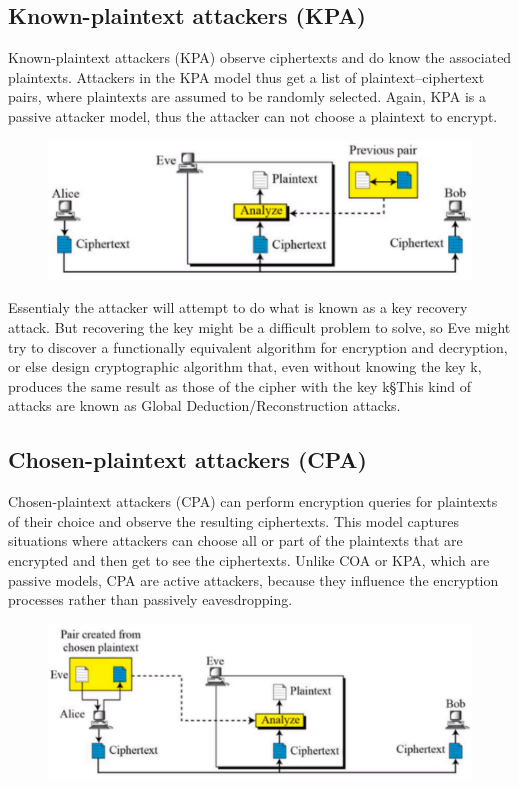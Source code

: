 	\subsection{Known-plaintext attackers (KPA)}
	Known-plaintext attackers (KPA) observe ciphertexts and do know the associated plaintexts. Attackers in the KPA model thus get a list of plaintext–ciphertext pairs, where plaintexts are assumed to be randomly selected. Again, KPA is a passive attacker model, thus the attacker can not choose a plaintext to encrypt.
	\begin{figure}
		\centering
		\includegraphics[width=0.7\linewidth]{Images/Chapter1/screenshot002}
		\caption{}
		\label{fig:chapter1_screenshot002}
	\end{figure}
	
	Essentialy the attacker will attempt to do what is known as a key recovery attack. But recovering the key might be a difficult problem to solve, so Eve might try to discover a functionally equivalent algorithm for encryption and decryption, or else design cryptographic algorithm that, even without knowing the key k, produces the same result as those of the cipher with the key k§This kind of attacks are known as Global Deduction/Reconstruction attacks.
	
	\subsection{Chosen-plaintext attackers (CPA)}
	Chosen-plaintext attackers (CPA) can perform encryption queries for	plaintexts of their choice and observe the resulting ciphertexts. This model captures situations where attackers can choose all or part of the plaintexts that are encrypted and then get to see the ciphertexts.
	Unlike COA or KPA, which are passive models, CPA are active attackers, because they influence the encryption processes rather than passively eavesdropping.
	
	\begin{figure}
		\centering
		\includegraphics[width=0.7\linewidth]{Images/Chapter1/screenshot003}
		\caption{}
		\label{fig:chapter1_screenshot003}
	\end{figure}
	
